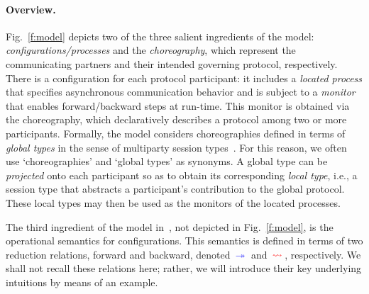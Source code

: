 \documentclass[runningheads,plain]{llncs}
\begin{document}
\paragraph{Overview.}
Fig.~\ref{f:model} depicts two of the three salient ingredients of the model:
\emph{configurations/processes} and the
\emph{choreography}, which represent the communicating partners and their intended governing protocol, respectively. 
There is a {configuration} for each protocol participant: it includes a \emph{located process} that specifies asynchronous communication behavior and is subject to a \emph{monitor} that enables forward/backward steps at run-time. This monitor is obtained via the choreography, which  declaratively describes a protocol among two or more participants. 
Formally, the model considers choreographies defined in terms of \emph{global types} in the sense of multiparty session types~\cite{DBLP:conf/popl/HondaYC08}. 
For this reason, we often use `choreographies' and `global types' as synonyms.
A global type can be \emph{projected} onto each participant so as to obtain 
its corresponding  \emph{local type}, i.e., a session type that abstracts a participant's contribution to the global protocol. These local types may then be used as the monitors of the located processes. 

The third ingredient of the model in~\cite{DBLP:conf/ppdp/MezzinaP17}, not depicted in Fig.~\ref{f:model}, is the operational semantics for configurations. This semantics is defined in terms of two reduction relations, forward and backward, denoted $\textcolor{blue}{\,\twoheadrightarrow\,}$  and $\textcolor{red}{\,\rightsquigarrow\,}$, respectively. We shall not recall these relations here; rather, we will introduce their key underlying intuitions by means of an example.
\end{document}
